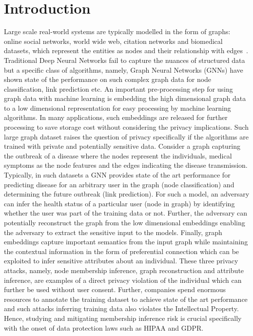 \section{Introduction}\label{introduction}

Large scale real-world systems are typically modelled in the form of graphs: online social networks, world wide web, citation networks and biomedical datasets, which represent the entities as nodes and their relationship with edges~\cite{zhou2018graph}.
Traditional Deep Neural Networks fail to capture the nuances of structured data but a specific class of algorithms, namely, Graph Neural Networks (GNNs) have shown state of the performance on such complex graph data for node classification, link prediction etc.
An important pre-processing step for using graph data with machine learning is embedding the high dimensional graph data to a low dimensional representation for easy processing by machine learning algorithms.
In many applications, such embeddings are released for further processing to save storage cost without considering the privacy implications.
Such large graph dataset raises the question of privacy specifically if the algorithms are trained with private and potentially sensitive data.
Consider a graph capturing the outbreak of a disease where the nodes represent the individuals, medical symptoms as the node features and the edges indicating the disease transmission.
Typically, in such datasets a GNN provides state of the art performance for predicting disease for an arbitrary user in the graph (node classification) and determining the future outbreak (link prediction).
For such a model, an adversary can infer the health status of a particular user (node in graph) by identifying whether the user was part of the training data or not.
Further, the adversary can potentially reconstruct the graph from the low dimensional embeddings enabling the adversary to extract the sensitive input to the models.
Finally, graph embeddings capture important semantics from the input graph while maintaining the contextual information in the form of preferential connection which can be exploited to infer sensitive attributes about an individual.
These three privacy attacks, namely, node membership inference, graph reconstruction and attribute inference, are examples of a direct privacy violation of the individual which can further be used without user consent. %
Further, companies spend enormous resources to annotate the training dataset to achieve state of the art performance and such attacks inferring training data also violates the Intellectual Property.
Hence, studying and mitigating membership inference risk is crucial specifically with the onset of data protection laws such as HIPAA and GDPR.

